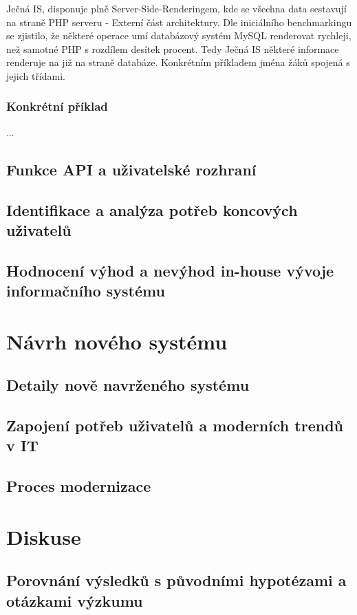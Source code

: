 \documentclass[FM,Proj]{tulthesis}
\begin{document}
Ječná IS, disponuje plně Server-Side-Renderingem, kde se všechna data sestavují na straně
PHP serveru - Externí část architektury. Dle iniciálního benchmarkingu se zjistilo, že
některé operace umí databázový systém MySQL renderovat rychleji, než samotné PHP s rozdílem
desítek procent. Tedy Ječná IS některé informace renderuje na již na straně databáze. 
Konkrétním příkladem jména žáků spojená s jejich třídami.

\subsection*{Konkrétní příklad}
...


\section{Funkce API a uživatelské rozhraní}
\section{Identifikace a analýza potřeb koncových uživatelů}
\section{Hodnocení výhod a nevýhod in-house vývoje informačního systému}

\chapter{Návrh nového systému}
\section{Detaily nově navrženého systému}
\section{Zapojení potřeb uživatelů a moderních trendů v IT}
\section{Proces modernizace}

\chapter{Diskuse}
\section{Porovnání výsledků s původními hypotézami a otázkami výzkumu}
\end{document}

